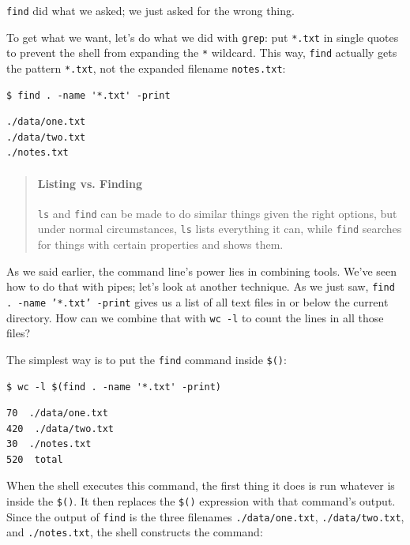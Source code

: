 \documentclass{book}
\begin{document}
\texttt{find} did what we asked; we just asked for the wrong thing.

To get what we want, let's do what we did with \texttt{grep}: put
\texttt{*.txt} in single quotes to prevent the shell from expanding the
\texttt{*} wildcard. This way, \texttt{find} actually gets the pattern
\texttt{*.txt}, not the expanded filename \texttt{notes.txt}:

\begin{verbatim}
$ find . -name '*.txt' -print
\end{verbatim}

\begin{verbatim}
./data/one.txt
./data/two.txt
./notes.txt
\end{verbatim}

\begin{quote}
\mbox{}\paragraph{Listing vs. Finding}

\texttt{ls} and \texttt{find} can be made to do similar things given the
right options, but under normal circumstances, \texttt{ls} lists
everything it can, while \texttt{find} searches for things with certain
properties and shows them.
\end{quote}

As we said earlier, the command line's power lies in combining tools.
We've seen how to do that with pipes; let's look at another technique.
As we just saw, \texttt{find . -name '*.txt' -print} gives us a list of
all text files in or below the current directory. How can we combine
that with \texttt{wc -l} to count the lines in all those files?

The simplest way is to put the \texttt{find} command inside
\texttt{\$()}:

\begin{verbatim}
$ wc -l $(find . -name '*.txt' -print)
\end{verbatim}

\begin{verbatim}
70  ./data/one.txt
420  ./data/two.txt
30  ./notes.txt
520  total
\end{verbatim}

When the shell executes this command, the first thing it does is run
whatever is inside the \texttt{\$()}. It then replaces the \texttt{\$()}
expression with that command's output. Since the output of \texttt{find}
is the three filenames \texttt{./data/one.txt}, \texttt{./data/two.txt},
and \texttt{./notes.txt}, the shell constructs the command:
\end{document}
